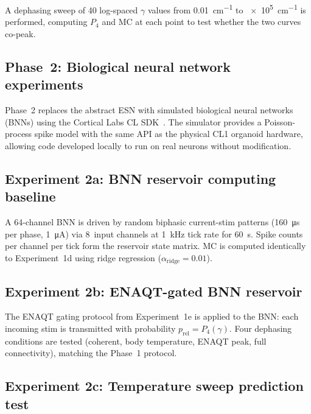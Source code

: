 \documentclass[twocolumn,11pt]{article}
\newcommand{\Pfour}{P_{4}}
\begin{document}
A dephasing sweep of 40 log-spaced $\gamma$ values
from \SI{0.01}{cm^{-1}} to \SI{e5}{cm^{-1}} is performed,
computing $\Pfour$ and MC at each point to test whether the
two curves co-peak.

\subsection{Phase~2: Biological neural network experiments}
\label{sec:meth-phase2}

Phase~2 replaces the abstract ESN with simulated biological
neural networks (BNNs) using the Cortical Labs CL
SDK~\cite{CLSDK2024}.  The simulator provides a Poisson-process
spike model with the same API as the physical CL1 organoid
hardware, allowing code developed locally to run on real neurons
without modification.

\subsection{Experiment 2a: BNN reservoir computing baseline}
\label{sec:meth-2a}

A 64-channel BNN is driven by random biphasic current-stim
patterns (\SI{160}{\micro\second} per phase, \SI{1}{\micro\ampere})
via 8~input channels at \SI{1}{\kilo\hertz} tick rate for
\SI{60}{\second}.  Spike counts per channel per tick form the
reservoir state matrix.  MC is computed identically to
Experiment~1d using ridge regression
($\alpha_{\mathrm{ridge}} = 0.01$).

\subsection{Experiment 2b: ENAQT-gated BNN reservoir}
\label{sec:meth-2b}

The ENAQT gating protocol from Experiment~1e is applied to the
BNN: each incoming stim is transmitted with probability
$p_{\mathrm{rel}} = \Pfour(\gamma)$.  Four dephasing conditions
are tested (coherent, body temperature, ENAQT peak, full
connectivity), matching the Phase~1 protocol.

\subsection{Experiment 2c: Temperature sweep prediction test}
\label{sec:meth-2c}
\end{document}
